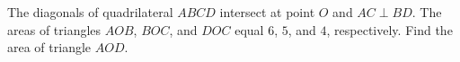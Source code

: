 The diagonals of quadrilateral $ABCD$ intersect at point $O$ and $AC \perp BD$. The areas of triangles $AOB$, $BOC$, and $DOC$ equal $6$, $5$, and $4$, respectively. Find the area of triangle $AOD$.
